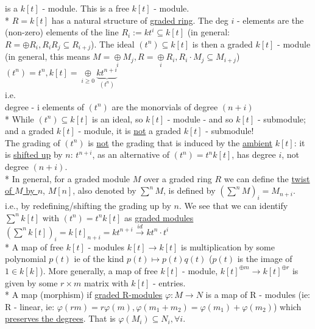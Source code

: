 \documentclass[11pt,a4paper]{report}
\begin{document}
              is a $k[t]$ - module. This is a free $k[t]$ - module.\\
              * $R = k[t]$ has a natural structure of \underline{graded ring}. The deg $i$ - elements are the (non-zero) elements of the line $R_i := kt^i \subseteq k[t]$ (in general: $R = \oplus R_i, R_iR_j \subseteq R_{i+j}$).
              The ideal $(t^n) \subseteq k[t]$ is then a graded $k[t]$ - module (in general, this means $M = \underset{i}{\oplus} M_j, R = \underset{i}{\oplus} R_i, R_i \cdot M_j \subseteq M_{i+j}$) $(t^n) = t^n, k[t] = \underset{i \ge 0}{\oplus} \underbrace{kt^{n+i}}_{(t^{n})}$\\
              i.e.\\
              degree - i elements of $(t^n)$ are the monorvials of degree $(n+i)$\\
              * While $(t^n) \subseteq k[t]$ is an ideal, so $k[t]$ - module - and so $k[t]$ - submodule; and a graded $k[t]$ - module, it is \underline{not} a graded $k[t]$ - submodule!\\
              The grading of $(t^n)$ is \underline{not} the grading that is induced by the \underline{ambient} $k[t]$: it is \underline{shifted up} by $n$: $t^{n+i}$, as an alternative of $(t^n) = t^nk[t]$, has degree $i$, not degree $(n+i)$.\\
              * In general, for a graded module $M$ over a graded ring $R$ we can define the \underline{twist of $M$ by $n$}, $M[n]$, also denoted by $\sum^nM$, is defined by $(\sum^nM)_i = M_{n+i}$.\\
              i.e., by redefining/shifting the grading up by $n$. We see that we can identify $\sum^nk[t]$ with $(t^n) = t^nk[t]$ as \underline{graded modules} $(\sum^nk[t])_i = k[t]_{n+i} = kt^{n+i} \xrightarrow{id} kt^n\cdot t^i$\\
              * A map of free $k[t]$ - modules $k[t] \rightarrow k[t]$ is multiplication by some polynomial $p(t)$ ie of the kind $p(t) \mapsto p(t)q(t)$ ($p(t)$ is the image of $1 \in k[k]$). More generally, a map of free $k[t]$ - module, $k[t]^{\oplus m} \rightarrow k[t]^{\oplus r}$ is given by some $r \times m$ matrix with $k[t]$ - entries.\\
              * A map (morphism) if \underline{graded R-modules} $\varphi: M \rightarrow N$ is a map of R - modules (ie: R - linear, ie: $\varphi(rm) = r \varphi(m), \varphi(m_1 + m_2) = \varphi(m_1) + \varphi(m_2)$) which \underline{preserves the degrees}. That is $\varphi(M_i) \subseteq N_i, \forall i$.\\
\end{document}
